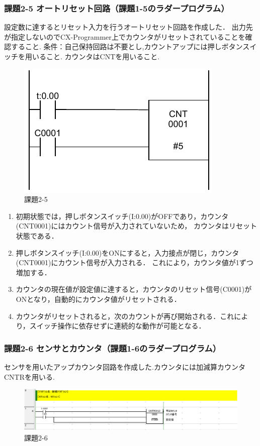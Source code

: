 \subsubsection*{課題2-5 オートリセット回路（課題1-5のラダープログラム）}
設定数に達するとリセット入力を行うオートリセット回路を作成した．
出力先が指定しないのでCX-Programmer上でカウンタがリセットされていることを確認すること.
条件：自己保持回路は不要とし,カウントアップには押しボタンスイッチを用いること.
カウンタはCNTを用いること.
\begin{figure}[H]
  \centering
  \includegraphics[scale=1]{sozai/22.pdf}
  \caption{課題2-5}
\end{figure}
\begin{enumerate}
  \item 初期状態では，押しボタンスイッチ(I:0.00)がOFFであり，カウンタ(CNT0001)にはカウント信号が入力されていないため，
  カウンタはリセット状態である．
  \item 押しボタンスイッチ(I:0.00)をONにすると，入力接点が閉じ，カウンタ(CNT0001)にカウント信号が入力される．
  これにより，カウンタ値が1ずつ増加する．
  \item カウンタの現在値が設定値に達すると，カウンタのリセット信号(C0001)がONとなり，自動的にカウンタ値がリセットされる．
  \item カウンタがリセットされると，次のカウントが再び開始される．これにより，スイッチ操作に依存せずに連続的な動作が可能となる．
\end{enumerate}



\subsubsection*{課題2-6 センサとカウンタ（課題1-6のラダープログラム）}
センサを用いたアップカウンタ回路を作成した.カウンタには加減算カウンタCNTRを用いる.
\begin{figure}[H]
  \centering
  \includegraphics[scale=1]{sozai/2-6-crop.pdf}
  \caption{課題2-6}
\end{figure}

